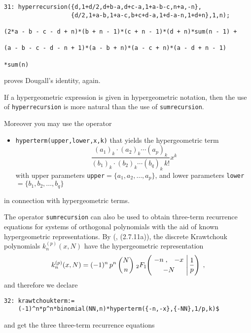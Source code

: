 {\small
\begin{verbatim}
31: hyperrecursion({d,1+d/2,d+b-a,d+c-a,1+a-b-c,n+a,-n},
                   {d/2,1+a-b,1+a-c,b+c+d-a,1+d-a-n,1+d+n},1,n);

(2*a - b - c - d + n)*(b + n - 1)*(c + n - 1)*(d + n)*sum(n - 1) + 

(a - b - c - d - n + 1)*(a - b + n)*(a - c + n)*(a - d + n - 1)

*sum(n)
\end{verbatim}
}\noindent
proves Dougall's identity, again.

If a hypergeometric expression is given in hypergeometric notation, then
the use of {\tt hyperrecursion} is more natural than the use of
{\tt sumrecursion}.

Moreover you may use the \REDUCE{} operator
\begin{itemize}
\item
{\tt hyperterm(upper,lower,x,k)} that yields the hypergeometric term
\[
\frac
{(a_{1})_{k}\cdot(a_{2})_{k}\cdots(a_{p})_{k}}
{(b_{1})_{k}\cdot(b_{2})_{k}\cdots(b_{q})_{k}\,k!}x^{k}
\]
with upper parameters {\tt upper}$=\{a_{1}, a_{2}, \ldots, a_{p}\}$,
and lower parameters {\tt lower}$=\{b_{1}, b_{2}, \ldots, b_{q}\}$
\end{itemize}
in connection with hypergeometric terms.

The operator {\tt sumrecursion} can also be used to 
obtain three-term recurrence equations for systems of orthogonal polynomials
with the aid of known hypergeometric representations. By
(\cite{NSU}, (2.7.11a)), the discrete Krawtchouk polynomials $k_n^{(p)}(x,N)$
have the hypergeometric representation
\[
k_n^{(p)}(x,N)=
(-1)^n\,p^n\,{{N}\choose{n}}\;
_2 F_1\left.
\!\!
\left(
\!\!\!\!
\begin{array}{c}
\multicolumn{1}{c}{\begin{array}{cc} -n\;, & -x \end{array}}\\[1mm]
\multicolumn{1}{c}{ -N}
            \end{array}
\!\!\!\!
\right| \frac{1}{p}\right)
\;,
\]
and therefore we declare

{\small
\begin{verbatim}
32: krawtchoukterm:=
    (-1)^n*p^n*binomial(NN,n)*hyperterm({-n,-x},{-NN},1/p,k)$
\end{verbatim}
}\noindent
and get the three three-term recurrence equations

